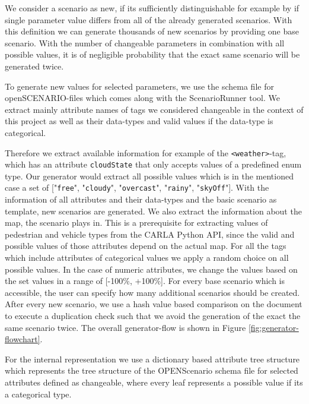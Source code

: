 \documentclass[conference, 11pt]{IEEEtran}
\begin{document}
We consider a scenario as new, if its sufficiently distinguishable for example by if single parameter value differs from all of the already generated scenarios. With this definition we can generate thousands of new scenarios by providing one base scenario. With the number of changeable parameters in combination with all possible values, it is of negligible probability that the exact same scenario will be generated twice.

To generate new values for selected parameters, we use the schema file for openSCENARIO-files which comes along with the ScenarioRunner tool. We extract mainly attribute names of tags we considered changeable in the context of this project as well as their data-types and valid values if the data-type is categorical.

 Therefore we extract available information for example of the \texttt{<weather>}-tag, which has an attribute \texttt{cloudState} that only accepts values of a predefined enum type. Our generator would extract all possible values which is in the mentioned case a set of ["\texttt{free}", "\texttt{cloudy}", "\texttt{overcast}", "\texttt{rainy}", "\texttt{skyOff}"]. With the information of all attributes and their data-types and the basic scenario as template, new scenarios are generated. We also extract the information about the map, the scenario plays in. This is a prerequisite for extracting values of pedestrian and vehicle types from the CARLA Python API, since the valid and possible values of those attributes depend on the actual map.
 For all the tags which include attributes of categorical values we apply a random choice on all possible values. In the case of numeric attributes, we change the values based on the set values in a range of [-100\%, +100\%].
 For every base scenario which is accessible, the user can specify how many additional scenarios should be created. After every new scenario, we use a hash value based comparison on the document to execute a duplication check such that we avoid the generation of the exact the same scenario twice.
The overall generator-flow is shown in Figure \ref{fig:generator-flowchart}.

For the internal representation we use a dictionary based attribute tree structure which represents the tree structure of the OPENScenario schema file for selected attributes defined as changeable, where every leaf represents a possible value if its a categorical type.
\end{document}
